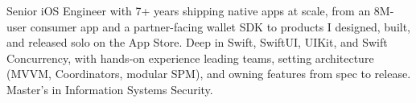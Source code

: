 Senior iOS Engineer with 7+ years shipping native apps at scale, from an 8M-user consumer app and a partner-facing wallet SDK to products I designed, built, and released solo on the App Store. Deep in Swift, SwiftUI, UIKit, and Swift Concurrency, with hands-on experience leading teams, setting architecture (MVVM, Coordinators, modular SPM), and owning features from spec to release. Master's in Information Systems Security.
